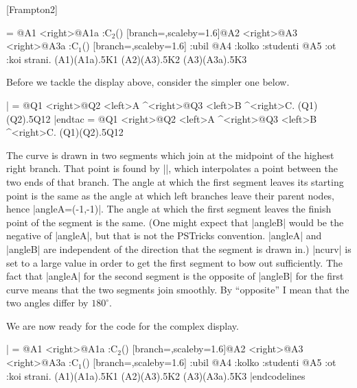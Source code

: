 
\example
\ftag{\the\Exno}[Frampton2]

\exdisplay
\hfil
\jtree[xunit=2.4em,yunit=3ex,style=arrows2,nodesep=0]
\def\broken{[branch=\brokenbranch,scaleby=1.6]}%
\! = {}@A1
   <right>{}@A1a
   :{C$_2$}()  \broken @A2
   <right>@A3
   <right>@A3a
   :{C$_1$}()  \broken
   :{ubil}  {}@A4
   :{kolko}  {}
   :{studenti}  {}@A5
   :{ot} :{koi} {strani}.
\psLNode(A1)(A1a){.5}{K1}
\psLNode(A2)(A3){.5}{K2}
\psLNode(A3)(A3a){.5}{K3}
\endjtree
\xe

Before we tackle the display above, consider the simpler one
below.

\exh \tac|
\jtree[xunit=3em,yunit=3ex,nodesep=0]
\! = @Q1 <right>@Q2
   <left>{A} ^<right>@Q3
   <left>{B} ^<right>{C}.
\psLNode(Q1)(Q2){.5}{Q12}
\endjtree
|endtac \hfil
\qquad\jtree[xunit=3em,yunit=3ex,nodesep=0]
\! = @Q1 <right>@Q2
   <left>{A} ^<right>@Q3
   <left>{B} ^<right>{C}.
\psLNode(Q1)(Q2){.5}{Q12}
\endjtree
\xe

The curve is drawn in two segments which join at the midpoint of
the highest right branch.  That point is found by |\psLNode|,
which interpolates a point between the two ends of that branch.
The angle at which the first segment leaves its starting point is the same
as the angle at which left branches leave their parent nodes, hence
|angleA={(-1,-1)}|.  The angle at which the first segment leaves
the finish point of the segment is the same.  (One might expect
that |angleB| would be the negative of |angleA|, but that is not
the PSTricks convention.  |angleA| and |angleB| are independent
of the direction that the segment is drawn in.) |ncurv| is set to a large value in
order to get the first segment to bow out sufficiently.  The fact
that |angleA| for the second segment is the opposite of |angleB|
for the first curve means that the two segments join smoothly.
By ``opposite'' I mean that the two angles differ by $180^\circ$.

\medskip
We are now ready for the code for the complex display.

\exdisplay
\codelines
|\jtree[xunit=2.4em,yunit=3ex,style=arrows2,nodesep=0]
\def\broken{[branch=\brokenbranch,scaleby=1.6]}%
\! = {}@A1
   <right>{}@A1a
   :{C$_2$}()  \broken @A2
   <right>@A3
   <right>@A3a
   :{C$_1$}()  \broken
   :{ubil}  {}@A4
   :{kolko}  {}
   :{studenti}  {}@A5
   :{ot} :{koi} {strani}.
\psLNode(A1)(A1a){.5}{K1}
\psLNode(A2)(A3){.5}{K2}
\psLNode(A3)(A3a){.5}{K3}
\endjtree|endcodelines
\xe

